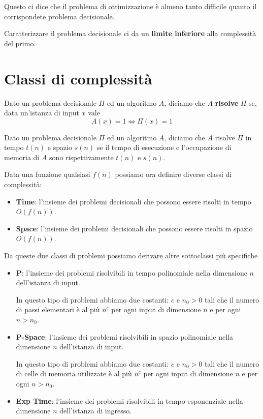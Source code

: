 Questo ci dice che il problema di ottimizzazione \`e almeno tanto difficile quanto il corrispondete problema decisionale.

Caratterizzare il problema decisionale ci da un \textbf{limite inferiore} alla complessit\`a del primo.

\section{Classi di complessit\`a}

\begin{theorem}
	Dato un problema decisionale $\Pi$ ed un algoritmo $A$, diciamo che $A$ \textbf{risolve} $\Pi$ se, data un'istanza di
	input $x$ vale
	\[ A(x) = 1 \Leftrightarrow \Pi(x) = 1 \]
\end{theorem}

\begin{theorem}
	Dato un problema decisionale $\Pi$ ed un algoritmo $A$, diciamo che $A$ risolve $\Pi$ in tempo $t(n)$ e spazio
	$s(n)$ se il tempo di esecuzione e l'occupazione di memoria di $A$ sono rispettivamente $t(n)$ e $s(n)$.
\end{theorem}

Data una funzione qualsiasi $f(n)$ possiamo ora definire diverse classi di complessit\`a:
\begin{itemize}
	\item \textbf{Time}: l'insieme dei problemi decisionali che possono essere risolti in tempo $O(f(n))$.
	\item \textbf{Space}: l'insieme dei problemi decisionali che possono essere risolti in spazio $O(f(n))$.
\end{itemize}
Da queste due classi di problemi possiamo derivare altre sottoclassi pi\`u specifiche
\begin{itemize}
	\item \textbf{P}: l'insieme dei problemi risolvibili in tempo polinomiale nella dimensione $n$ dell'istanza di input.

	      In questo tipo di problemi abbiamo due costanti: $c$ e $n_0 > 0$ tali che il numero di passi elementari \`e al
	      pi\`u $n^c$ per ogni input di dimensione $n$ e per ogni $n > n_0$.

	\item \textbf{P-Space}: l'insieme dei problemi risolvibili in spazio polinomiale nella dimensione $n$ dell'istanza
	      di input.

	      In questo tipo di problemi abbiamo due costanti: $c$ e $n_0 > 0$ tali che il numero di celle di memoria
	      utilizzate \`e al pi\`u $n^c$ per ogni input di dimensione $n$ e per ogni $n > n_0$.
	\item \textbf{Exp Time}: l'insieme dei problemi risolvibili in tempo esponenziale nella dimensione $n$ dell'istanza
	      di ingresso.
\end{itemize}

